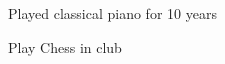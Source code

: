 

\begin{cventries}

  \cventry
    {
      \begin{cvitems} %
        \item {Played classical piano for 10 years}
        \item {Play Chess in club}
      \end{cvitems}
    }

\end{cventries}
